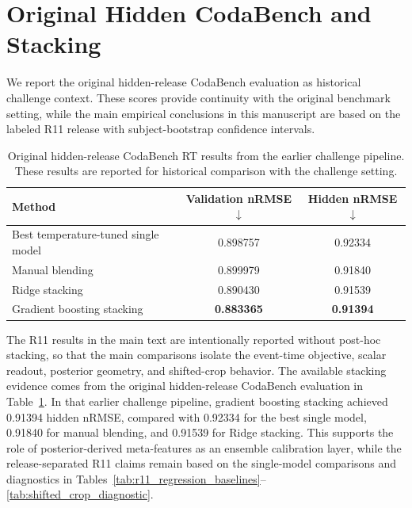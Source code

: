 \documentclass[12pt]{article}
\begin{document}
\appendix

\section{Original Hidden CodaBench and Stacking}
\label{app:codabench_stacking}

We report the original hidden-release CodaBench evaluation as historical challenge context. These scores provide continuity with the original benchmark setting, while the main empirical conclusions in this manuscript are based on the labeled R11 release with subject-bootstrap confidence intervals.

\begin{table}[!h]
\centering
\caption{Original hidden-release CodaBench RT results from the earlier challenge pipeline. These results are reported for historical comparison with the challenge setting.}
\label{tab:appendix_codabench}
\small
\setlength{\tabcolsep}{8pt}
\renewcommand{\arraystretch}{1.15}
\begin{tabular}{lcc}
\toprule
\textbf{Method} & \textbf{Validation nRMSE} $\downarrow$ & \textbf{Hidden nRMSE} $\downarrow$ \\
\midrule
Best temperature-tuned single model & 0.898757 & 0.92334 \\
Manual blending & 0.899979 & 0.91840 \\
Ridge stacking & 0.890430 & 0.91539 \\
Gradient boosting stacking & \textbf{0.883365} & \textbf{0.91394} \\
\bottomrule
\end{tabular}
\end{table}

The R11 results in the main text are intentionally reported without post-hoc stacking, so that the main comparisons isolate the event-time objective, scalar readout, posterior geometry, and shifted-crop behavior. The available stacking evidence comes from the original hidden-release CodaBench evaluation in Table~\ref{tab:appendix_codabench}. In that earlier challenge pipeline, gradient boosting stacking achieved 0.91394 hidden nRMSE, compared with 0.92334 for the best single model, 0.91840 for manual blending, and 0.91539 for Ridge stacking. This supports the role of posterior-derived meta-features as an ensemble calibration layer, while the release-separated R11 claims remain based on the single-model comparisons and diagnostics in Tables~\ref{tab:r11_regression_baselines}--\ref{tab:shifted_crop_diagnostic}.
\end{document}
